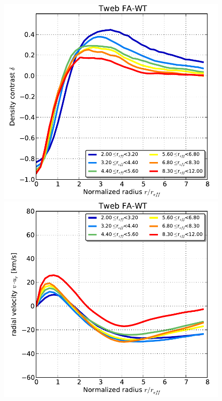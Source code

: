 \documentclass[a4,useAMS,usenatbib,usegraphicx]{latex/mn2e}
\begin{document}
\begin{flushleft}
\begin{figure}
  \includegraphics[trim = 1mm 0mm 5mm 0mm, clip, keepaspectratio=true,
  width=0.24\textheight]{./figures/voids_density_TwebFAG1.pdf}
  \includegraphics[trim = 1mm 0mm 5mm 0mm, clip, keepaspectratio=true,
  width=0.24\textheight]{./figures/voids_velocity_TwebFAG1.pdf}

\end{figure}
\end{flushleft}
\end{document}
